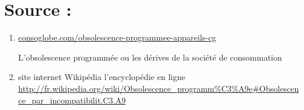 \documentclass[10pt]{../fiche}
\begin{document}
\section*{Source :}
\begin{enumerate}
\item \url{consoglobe.com/obsolescence-programmee-appareils-cg}

\textsf{L'obsolescence programmée ou les dérives de la société de consommation}

\item site internet Wikipédia l’encyclopédie en ligne
\url{http://fr.wikipedia.org/wiki/Obsolescence_programm\%C3\%A9e#Obsolescence_par_incompatibilit.C3.A9}

\end{enumerate}
\end{document}
